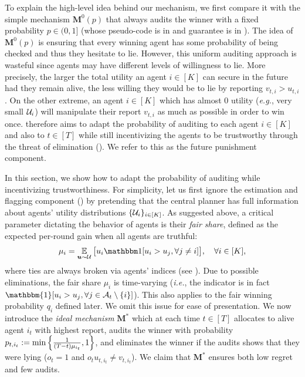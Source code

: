 

To explain the high-level idea behind our \mechname mechanism, we first compare it with the simple mechanism $\bm M^0(p)$ that always audits the winner with a fixed probability $p\in (0,1]$ (whose pseudo-code is in  and guarantee is in ). The idea of $\bm M^0(p)$ is ensuring that every winning agent has some probability of being checked and thus they hesitate to lie. However, this uniform auditing approach is wasteful since agents may have different levels of willingness to lie. More precisely, the larger the total utility an agent $i\in[K]$ can secure in the future had they remain alive, the less willing they would be to lie by reporting $v_{t,i}>u_{t,i}$. On the other extreme, an agent $i\in[K]$ which has almost 0 utility (\textit{e.g.}, very small $\mathcal{U}_i$) will manipulate their report $v_{t,i}$ as much as possible in order to win once. 
\mechname therefore aims to adapt the probability of auditing to each agent $i\in[K]$ and also to $t\in[T]$ while still incentivizing the agents to be trustworthy through the threat of elimination (). We refer to this as the future punishment component. 

In this section, we show how to adapt the probability of auditing while incentivizing trustworthiness. For simplicity, let us first ignore the estimation and flagging component () by pretending that the central planner has full information about agents' utility distributions $\{\mathcal{U}_i\}_{i\in [K]}$. As suggested above, a critical parameter dictating the behavior of agents is their \emph{fair share}, defined as the expected per-round gain when all agents are truthful:
\begin{equation*}
\mu_i=\E_{\bm u\sim \mV}\big [u_{i}\mathbbm 1[u_i>u_{j},\forall j\ne i]\big ],\quad \forall i\in [K],
\end{equation*}
where ties are always broken via agents' indices (see ). Due to possible eliminations, the fair share $\mu_i$ is time-varying (\textit{i.e.}, the indicator is in fact $\mathbbm{1}[u_i>u_j,\forall j\in \mA_t\setminus \{i\}]$). This also applies to the fair winning probability $q_i$ defined later. We omit this issue for ease of presentation. We now introduce the \emph{ideal mechanism} $\bm M^\ast$ which at each time $t\in[T]$ allocates to alive agent $i_t$ with highest report, audits the winner with probability $p_{t,i_t}:=\min\left\{ \frac{1}{(T-t)\mu_{i_t}},1 \right\} $, and eliminates the winner if the audits shows that they were lying ($o_t=1$ and $o_t u_{t,i_t}\neq v_{t,i_t}$).
We claim that $\bm M^\ast$ ensures both low regret and few audits.

